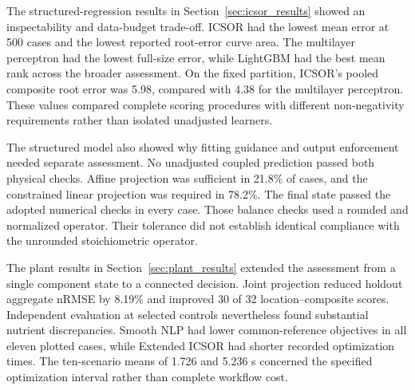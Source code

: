 The structured-regression results in Section~\ref{sec:icsor_results} showed an inspectability and data-budget trade-off. ICSOR had the lowest mean error at 500 cases and the lowest reported root-error curve area. The multilayer perceptron had the lowest full-size error, while LightGBM had the best mean rank across the broader assessment. On the fixed partition, ICSOR's pooled composite root error was 5.98, compared with 4.38 for the multilayer perceptron. These values compared complete scoring procedures with different non-negativity requirements rather than isolated unadjusted learners.

The structured model also showed why fitting guidance and output enforcement needed separate assessment. No unadjusted coupled prediction passed both physical checks. Affine projection was sufficient in 21.8\% of cases, and the constrained linear projection was required in 78.2\%. The final state passed the adopted numerical checks in every case. Those balance checks used a rounded and normalized operator. Their tolerance did not establish identical compliance with the unrounded stoichiometric operator.

The plant results in Section~\ref{sec:plant_results} extended the assessment from a single component state to a connected decision. Joint projection reduced holdout aggregate nRMSE by 8.19\% and improved 30 of 32 location--composite scores. Independent evaluation at selected controls nevertheless found substantial nutrient discrepancies. Smooth NLP had lower common-reference objectives in all eleven plotted cases, while Extended ICSOR had shorter recorded optimization times. The ten-scenario means of 1.726 and 5.236 s concerned the specified optimization interval rather than complete workflow cost.

